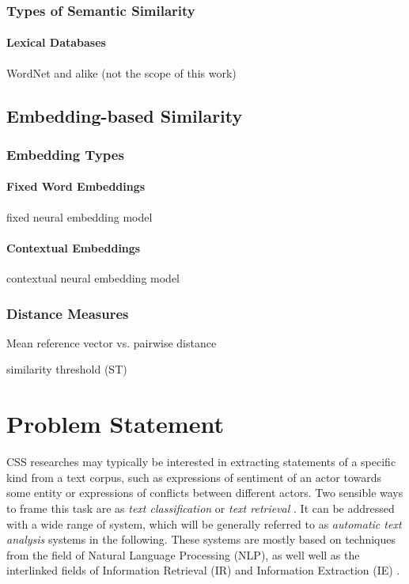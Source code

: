 \documentclass[11pt]{scrreprt}
\let\cite\parencite  %
\begin{document}
\subsection{Types of Semantic Similarity}

\subsubsection{Lexical Databases}
WordNet and alike (not the scope of this work)


\section{Embedding-based Similarity}

\subsection{Embedding Types}

\subsubsection{Fixed Word Embeddings}
fixed neural embedding model


\subsubsection{Contextual Embeddings}
contextual neural embedding model


\subsection{Distance Measures}

Mean reference vector vs. pairwise distance

similarity threshold (ST)

\chapter{Problem Statement}
\label{cha:problem-statement}
CSS researches may typically be interested in extracting statements of a specific kind from a text corpus, such as expressions of sentiment of an actor towards some entity or expressions of conflicts between different actors. Two sensible ways to frame this task are as \textit{text classification} \cite{kowsariTextClassificationAlgorithms2019} or \textit{text retrieval} \cite{manningIntroductionInformationRetrieval2008}. It can be addressed with a wide range of system, which will be generally referred to as  \textit{automatic text analysis} systems in the following. These systems are mostly based on techniques from the field of Natural Language Processing (NLP), as well well as the interlinked fields of Information Retrieval (IR) and Information Extraction (IE) \cite{chowdharyNaturalLanguageProcessing2020}.
\end{document}
